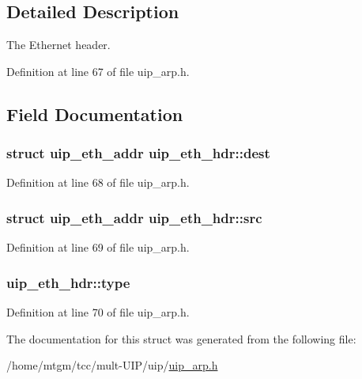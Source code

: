 \subsection{Detailed Description}
The Ethernet header. 

Definition at line 67 of file uip\_\-arp.h.



\subsection{Field Documentation}
\hypertarget{structuip__eth__hdr_ab684c17bf48c8e3b3fcf97b06b4c6ee1}{
\subsubsection[{dest}]{\setlength{\rightskip}{0pt plus 5cm}struct {\bf uip\_\-eth\_\-addr} {\bf uip\_\-eth\_\-hdr::dest}}}
\label{structuip__eth__hdr_ab684c17bf48c8e3b3fcf97b06b4c6ee1}


Definition at line 68 of file uip\_\-arp.h.

\hypertarget{structuip__eth__hdr_a1abbbe7bc5d7d033c727691528b85b8d}{
\subsubsection[{src}]{\setlength{\rightskip}{0pt plus 5cm}struct {\bf uip\_\-eth\_\-addr} {\bf uip\_\-eth\_\-hdr::src}}}
\label{structuip__eth__hdr_a1abbbe7bc5d7d033c727691528b85b8d}


Definition at line 69 of file uip\_\-arp.h.

\hypertarget{structuip__eth__hdr_ac9273cc1fcdaeeddc523ca9f34977e06}{
\subsubsection[{type}]{ {\bf uip\_\-eth\_\-hdr::type}}}
\label{structuip__eth__hdr_ac9273cc1fcdaeeddc523ca9f34977e06}


Definition at line 70 of file uip\_\-arp.h.



The documentation for this struct was generated from the following file:\begin{DoxyCompactItemize}
\item 
/home/mtgm/tcc/mult-\/UIP/uip/\hyperlink{uip__arp_8h}{uip\_\-arp.h}\end{DoxyCompactItemize}
